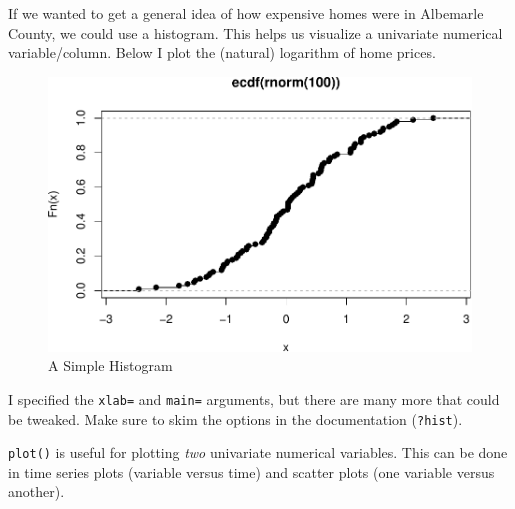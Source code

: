 \documentclass[
  12pt,
  krantz2]{krantz}
\makeatletter
\newenvironment{Shaded}{\begin{snugshade}}{\end{snugshade}}
\newcommand{\AttributeTok}[1]{\textcolor[rgb]{0.61,0.61,0.61}{#1}}
\newcommand{\FunctionTok}[1]{\textcolor[rgb]{0,0,0}{#1}}
\newcommand{\NormalTok}[1]{#1}
\newcommand{\SpecialCharTok}[1]{\textcolor[rgb]{0,0,0}{#1}}
\newcommand{\StringTok}[1]{\textcolor[rgb]{0.5,0.5,0.5}{#1}}
\newenvironment{kframe}{%
\medskip{}
\setlength{\fboxsep}{.8em}
 \def\at@end@of@kframe{}%
 \ifinner\ifhmode%
  \def\at@end@of@kframe{\end{minipage}}%
  \begin{minipage}{\columnwidth}%
 \fi\fi%
 \def\FrameCommand##1{\hskip\@totalleftmargin \hskip-\fboxsep
 \colorbox{shadecolor}{##1}\hskip-\fboxsep
     \hskip-\linewidth \hskip-\@totalleftmargin \hskip\columnwidth}%
 \MakeFramed {\advance\hsize-\width
   \@totalleftmargin\z@ \linewidth\hsize
   \@setminipage}}%
 {\par\unskip\endMakeFramed%
 \at@end@of@kframe}
\renewenvironment{Shaded}{\begin{kframe}}{\end{kframe}}
\makeatother
\begin{document}
If we wanted to get a general idea of how expensive homes were in Albemarle County, we could use a histogram. This helps us visualize a univariate numerical variable/column. Below I plot the (natural) logarithm of home prices.

\begin{Shaded}
\end{Shaded}

\begin{figure}

{\centering \includegraphics[width=0.8\linewidth]{r_and_python_book_files/figure-latex/unnamed-chunk-217-1} 

}

\caption{A Simple Histogram}\label{fig:unnamed-chunk-217}
\end{figure}

I specified the \texttt{xlab=} and \texttt{main=} arguments, but there are many more that could be tweaked. Make sure to skim the options in the documentation (\texttt{?hist}).

\texttt{plot()} is useful for plotting \emph{two} univariate numerical variables. This can be done in time series plots (variable versus time) and scatter plots (one variable versus another).
\end{document}
